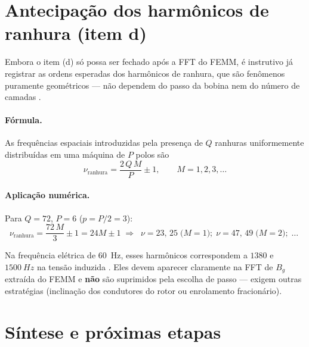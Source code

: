 \documentclass[12pt,a4paper]{article}
\begin{document}
\section{Antecipação dos harmônicos de ranhura (item d)}

Embora o item (d) só possa ser fechado após a FFT do FEMM, é instrutivo já registrar as ordens esperadas dos harmônicos de ranhura, que são fenômenos puramente geométricos --- não dependem do passo da bobina nem do número de camadas \cite[\S B.5]{chapman2013}.

\paragraph{Fórmula.} As frequências espaciais introduzidas pela presença de $Q$ ranhuras uniformemente distribuídas em uma máquina de $P$ polos são
\begin{equation}
\nu_{\text{ranhura}} = \frac{2\,Q\,M}{P} \pm 1, \qquad M = 1, 2, 3, \ldots
\label{eq:slot}
\end{equation}

\paragraph{Aplicação numérica.} Para $Q=72$, $P=6$ ($p=P/2=3$):
\[
\nu_{\text{ranhura}} = \frac{72\,M}{3} \pm 1 = 24M \pm 1
\;\Rightarrow\;
\boxed{\;\nu = 23,\,25\;\text{(}M=1\text{)};\; \nu = 47,\,49\;\text{(}M=2\text{)};\; \ldots\;}
\]

\noindent Na frequência elétrica de \SI{60}{Hz}, esses harmônicos correspondem a $1380$ e $\SI{1500}{Hz}$ na tensão induzida \cite[Eq.~B-26]{chapman2013}. Eles devem aparecer claramente na FFT de $B_g$ extraída do FEMM e \textbf{não} são suprimidos pela escolha de passo --- exigem outras estratégias (inclinação dos condutores do rotor ou enrolamento fracionário).

\section{Síntese e próximas etapas}
\end{document}
